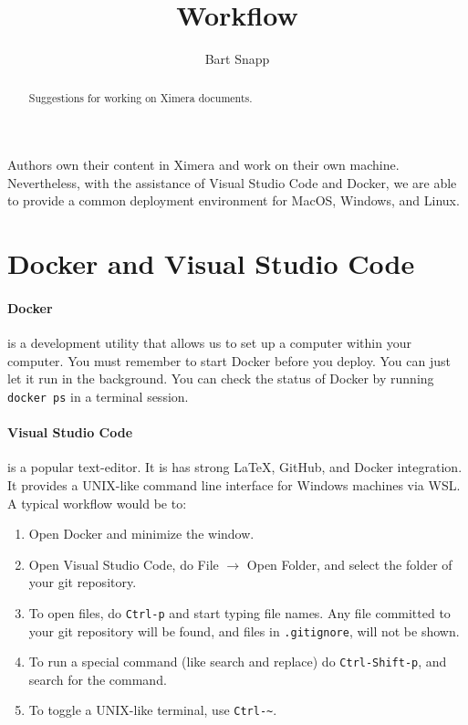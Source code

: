 \documentclass{ximera}
\title{Workflow}
\author{Bart Snapp}
\begin{document}
\begin{abstract}
    Suggestions for working on Ximera documents.
\end{abstract}
\maketitle

Authors own their content in Ximera and work on their own machine.
Nevertheless, with the assistance of Visual Studio Code and Docker, we are able
to provide a common deployment environment for MacOS, Windows, and Linux.

\section{Docker and Visual Studio Code}

\paragraph{Docker} is a development utility that allows us to set up a computer
within your
computer. You must remember to start Docker before you deploy. You can just let
it run in the background. You can check the status of Docker by running
\verb!docker ps! in a terminal session.

\paragraph{Visual Studio Code}
is a popular text-editor. It is has strong \LaTeX, GitHub,
and Docker integration. It provides a UNIX-like command line interface for
Windows machines via WSL. A typical workflow would be to:
\begin{enumerate}
    \item Open Docker and minimize the window.
    \item Open Visual Studio Code, do File $\to$ Open Folder, and select the
          folder of your git repository.
    \item To open files, do \verb!Ctrl-p! and start typing file names. Any
          file
          committed to your git repository will be found, and files in
          \verb!.gitignore!, will not be shown.
    \item To run a special command (like search and replace) do
          \verb!Ctrl-Shift-p!, and search for the command.
    \item To toggle a UNIX-like terminal, use \verb!Ctrl-~!.
\end{enumerate}
\end{document}
